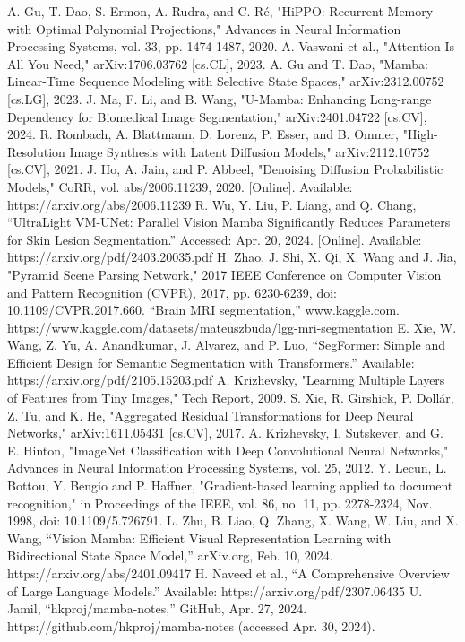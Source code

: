 \documentclass[conference]{IEEEtran}
\begin{document}
\begin{thebibliography}{00}
     A. Gu, T. Dao, S. Ermon, A. Rudra, and C. Ré, "HiPPO: Recurrent Memory with Optimal Polynomial Projections," Advances in Neural Information Processing Systems, vol. 33, pp. 1474-1487, 2020.
     A. Vaswani et al., "Attention Is All You Need," arXiv:1706.03762 [cs.CL], 2023.
     A. Gu and T. Dao, "Mamba: Linear-Time Sequence Modeling with Selective State Spaces," arXiv:2312.00752 [cs.LG], 2023.
     J. Ma, F. Li, and B. Wang, "U-Mamba: Enhancing Long-range Dependency for Biomedical Image Segmentation," arXiv:2401.04722 [cs.CV], 2024.
     R. Rombach, A. Blattmann, D. Lorenz, P. Esser, and B. Ommer, "High-Resolution Image Synthesis with Latent Diffusion Models," arXiv:2112.10752 [cs.CV], 2021.
     J. Ho, A. Jain, and P. Abbeel, "Denoising Diffusion Probabilistic Models," CoRR, vol. abs/2006.11239, 2020. [Online]. Available: https://arxiv.org/abs/2006.11239
     R. Wu, Y. Liu, P. Liang, and Q. Chang, “UltraLight VM-UNet: Parallel Vision Mamba Significantly Reduces Parameters for Skin Lesion Segmentation.” Accessed: Apr. 20, 2024. [Online]. Available: https://arxiv.org/pdf/2403.20035.pdf
     H. Zhao, J. Shi, X. Qi, X. Wang and J. Jia, "Pyramid Scene Parsing Network," 2017 IEEE Conference on Computer Vision and Pattern Recognition (CVPR), 2017, pp. 6230-6239, doi: 10.1109/CVPR.2017.660.
     “Brain MRI segmentation,” www.kaggle.com. https://www.kaggle.com/datasets/mateuszbuda/lgg-mri-segmentation
     E. Xie, W. Wang, Z. Yu, A. Anandkumar, J. Alvarez, and P. Luo, “SegFormer: Simple and Efficient Design for Semantic Segmentation with Transformers.” Available: https://arxiv.org/pdf/2105.15203.pdf
     A. Krizhevsky, "Learning Multiple Layers of Features from Tiny Images," Tech Report, 2009.
     S. Xie, R. Girshick, P. Dollár, Z. Tu, and K. He, "Aggregated Residual Transformations for Deep Neural Networks," arXiv:1611.05431 [cs.CV], 2017.
     A. Krizhevsky, I. Sutskever, and G. E. Hinton, "ImageNet Classification with Deep Convolutional Neural Networks," Advances in Neural Information Processing Systems, vol. 25, 2012.
     Y. Lecun, L. Bottou, Y. Bengio and P. Haffner, "Gradient-based learning applied to document recognition," in Proceedings of the IEEE, vol. 86, no. 11, pp. 2278-2324, Nov. 1998, doi: 10.1109/5.726791.
     L. Zhu, B. Liao, Q. Zhang, X. Wang, W. Liu, and X. Wang, “Vision Mamba: Efficient Visual Representation Learning with Bidirectional State Space Model,” arXiv.org, Feb. 10, 2024. https://arxiv.org/abs/2401.09417   
     H. Naveed et al., “A Comprehensive Overview of Large Language Models.” Available: https://arxiv.org/pdf/2307.06435
     U. Jamil, “hkproj/mamba-notes,” GitHub, Apr. 27, 2024. https://github.com/hkproj/mamba-notes (accessed Apr. 30, 2024).
\end{thebibliography}
\end{document}
